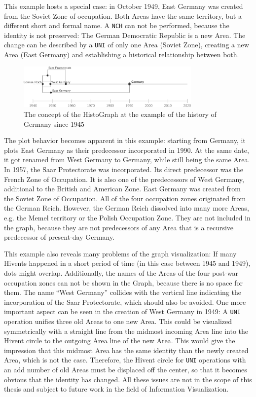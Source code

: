 This example hosts a special case: in October 1949, East Germany was created from the Soviet Zone of occupation. Both Areas have the same territory, but a different short and formal name. A \texttt{NCH} can not be performed, because the identity is not preserved: The German Democratic Republic is a new Area. The change can be described by a \texttt{UNI} of only one Area (Soviet Zone), creating a new Area (East Germany) and establishing a historical relationship between both.

\begin{figure}[H]
  \vspace{1em}
  \centering
  \includegraphics[width=0.8\textwidth]{graphics/development/histograph/example_germany}
  \caption{The concept of the HistoGraph at the example of the history of Germany since 1945}
  \label{fig:example_germany}
\end{figure}

The plot behavior becomes apparent in this example: starting from Germany, it plots East Germany as their predecessor incorporated in 1990. At the same date, it got renamed from West Germany to Germany, while still being the same Area. In 1957, the Saar Protectorate was incorporated. Its direct predecessor was the French Zone of Occupation. It is also one of the predecessors of West Germany, additional to the British and American Zone. East Germany was created from the Soviet Zone of Occupation. All of the four occupation zones originated from the German Reich. However, the German Reich dissolved into many more Areas, e.g. the Memel territory or the Polish Occupation Zone. They are not included in the graph, because they are not predecessors of any Area that is a recursive predecessor of present-day Germany.

This example also reveals many problems of the graph visualization: If many Hivents happened in a short period of time (in this case between 1945 and 1949), dots might overlap. Additionally, the names of the Areas of the four post-war occupation zones can not be shown in the Graph, because there is no space for them. The name ``West Germany'' collides with the vertical line indicating the incorporation of the Saar Protectorate, which should also be avoided. One more important aspect can be seen in the creation of West Germany in 1949: A \texttt{UNI} operation unifies three old Areas to one new Area. This could be visualized symmetrically with a straight line from the midmost incoming Area line into the Hivent circle to the outgoing Area line of the new Area. This would give the impression that this midmost Area has the same identity than the newly created Area, which is not the case. Therefore, the Hivent circle for \texttt{UNI} operations with an add number of old Areas must be displaced off the center, so that it becomes obvious that the identity has changed. All these issues are not in the scope of this thesis and subject to future work in the field of Information Visualization.

